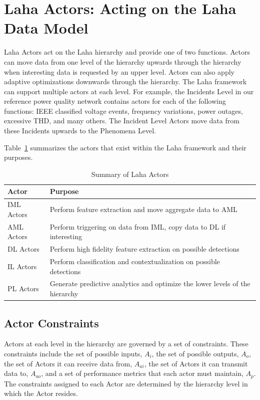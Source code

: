 \section{Laha Actors: Acting on the Laha Data Model}\label{sec:laha-actors:-acting-on-the-laha-data-model}
Laha Actors act on the Laha hierarchy and provide one of two functions. Actors can move data from one level of the hierarchy upwards through the hierarchy when interesting data is requested by an upper level. Actors can also apply adaptive optimizations downwards through the hierarchy. The Laha framework can support multiple actors at each level. For example, the Incidents Level in our reference power quality network contains actors for each of the following functions: IEEE classified voltage events, frequency variations, power outages, excessive THD, and many others. The Incident Level Actors move data from these Incidents upwards to the Phenomena Level.

Table~\ref{laha-actors-tables} summarizes the actors that exist within the Laha framework and their purposes.

\begin{table}[h]
	\centering
	\caption{Summary of Laha Actors}
	\begin{tabularx}{\textwidth}{lX}
		\toprule
		\textbf{Actor} & \textbf{Purpose} \\
		\midrule
		IML Actors & Perform feature extraction and move aggregate data to AML \\
		AML Actors & Perform triggering on data from IML, copy data to DL if interesting \\
		DL Actors & Perform high fidelity feature extraction on possible detections \\
		IL Actors & Perform classification and contextualization on possible detections \\
		PL Actors & Generate predictive analytics and optimize the lower levels of the hierarchy \\
		\bottomrule
	\end{tabularx}
	\label{laha-actors-tables}
\end{table}

\subsection{Actor Constraints}\label{subsec:actor-constraints}
Actors at each level in the hierarchy are governed by a set of constraints. These constraints include the set of possible inputs, $A_i$, the set of possible outputs, $A_o$, the set of Actors it can receive data from, $A_{ai}$, the set of Actors it can transmit data to, $A_{ao}$, and a set of performance metrics that each actor must maintain, $A_p$. The constraints assigned to each Actor are determined by the hierarchy level in which the Actor resides.

